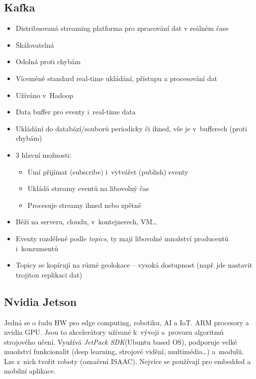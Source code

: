 \subsection{Kafka}
\begin{itemize}
    \item Distribuovaná streaming platforma pro zpracování dat v reálném čase
    \item Škálovatelná
    \item Odolná proti chybám
    \item Víceméně standard real-time ukládání, přístupu a procesování dat
    \item Užíváno v~Hadoop
    \item Data buffer pro eventy i~real-time data
    \item Ukládání do databází/souborů periodicky či ihned, vše je v~bufferech (proti chybám)
    \item 3 hlavní možnosti:
    \begin{itemize}
        \item Umí přijímat (subscribe) i~vytvářet (publish) eventy
        \item Ukládá streamy eventů na libovolný čas
        \item Procesuje streamy ihned nebo zpětně
    \end{itemize}
    \item Běží na serveru, cloudu, v~kontejnerech, VM\dots
    \item Eventy rozdělené podle \textit{topics}, ty mají libovolné množství producentů i~konzumentů
    \item Topicy se kopírují na různé geolokace -- vysoká dostupnost (např.\,jde nastavit trojitou replikaci dat)
\end{itemize}

\subsection{Nvidia Jetson}
Jedná se o řadu HW pro edge computing, robotiku, AI a IoT. ARM procesory a nvidia GPU. Jsou to akcelerátory užívané k~vývoji a~provozu algoritmů strojového učení. Využívá \textit{JetPack SDK}(Ubuntu based OS), podporuje velké množství funkcionalit (deep learning, strojové vidění, multimédia\dots) a~modulů. Lze z~nich tvořit roboty (označení ISAAC). Nejvíce se používají pro embedded a mobilní aplikace. 

